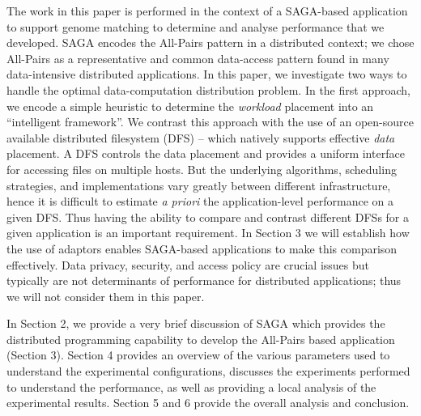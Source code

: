 \documentclass{rspublic}
\begin{document}
The work in this paper is performed in the context of a SAGA-based
application to support genome matching to determine and analyse
performance that we developed. SAGA encodes the All-Pairs pattern in a
distributed context; we chose All-Pairs as a representative and
common data-access pattern found in many data-intensive distributed
applications.  In this paper, we investigate two ways to handle the
optimal data-computation distribution problem.  In the first approach,
we encode a simple heuristic to determine the {\it workload} placement
into an ``intelligent framework''. We contrast this approach with the
use of an open-source available distributed filesystem (DFS) -- which
natively supports effective {\it data} placement. %
A DFS controls the data placement and provides a uniform interface for
accessing files on multiple hosts. But the underlying algorithms,
scheduling strategies, and implementations vary greatly between
different infrastructure, hence it is difficult to estimate {\it a
  priori} the application-level performance on a given DFS.  Thus
having the ability to compare and contrast different DFSs for a given
application is an important requirement. In Section 3 we will
establish how the use of adaptors enables SAGA-based applications to
make this comparison effectively. Data privacy, security, and access
policy are crucial issues but typically are not determinants of
performance for distributed applications; thus we will not consider
them in this paper.

In Section 2, we provide a very brief discussion of SAGA which
provides the distributed programming capability to develop the
All-Pairs based application (Section 3). Section 4 provides an
overview of the various parameters used to understand the experimental
configurations, discusses the experiments performed to understand the
performance, as well as providing a local analysis of the experimental
results. Section 5 and 6 provide the overall analysis and conclusion.


\end{document}
